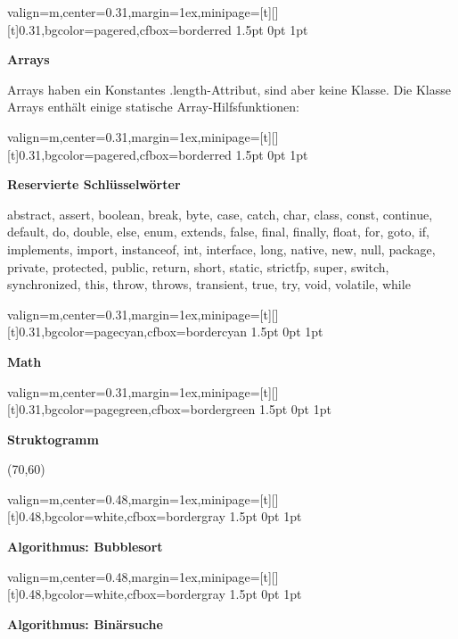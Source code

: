 \documentclass[11pt, a4paper, landscape]{article}
\newcommand{\fancyheader}[1]{
	\centerline{\sffamily \textbf{ \large #1}}
}
\newenvironment{fancybox}[2]
{
	\begin{adjustbox}{valign=m,center=0.31\textwidth,margin=1ex,minipage=[t][][t]{0.31\textwidth},bgcolor=#1,cfbox=#2 1.5pt 0pt 1pt}
	\begin{centering}
}
{
	\end{centering}
	\end{adjustbox}
}
\newenvironment{fancyboxwide}[2]
{
	\begin{adjustbox}{valign=m,center=0.48\textwidth,margin=1ex,minipage=[t][][t]{0.48\textwidth},bgcolor=#1,cfbox=#2 1.5pt 0pt 1pt}
	\begin{centering}
}
{
	\end{centering}
	\end{adjustbox}
}
\begin{document}
\begin{multicols}{3}
\begin{fancybox}{pagered}{borderred}
\fancyheader{Arrays}
\raggedright {
	Arrays haben ein Konstantes {\ttfamily .length}-Attribut, sind aber keine Klasse. Die Klasse {\ttfamily Arrays} enthält einige statische Array-Hilfsfunktionen:
}

\end{fancybox}

\begin{fancybox}{pagered}{borderred}
\fancyheader{Reservierte Schlüsselwörter}
{\ttfamily abstract, assert, boolean, break, byte, case, catch, char, class, const, continue, default, do, double, else, enum, extends, false, final, finally, float, for, goto, if, implements, import, instanceof, int, interface, long, native, new, null, package, private, protected, public, return, short, static, strictfp, super, switch, synchronized, this, throw, throws, transient, true, try, void, volatile, while}
\end{fancybox}

\begin{fancybox}{pagecyan}{bordercyan}
\fancyheader{Math}

\end{fancybox}

\begin{fancybox}{pagegreen}{bordergreen}
\fancyheader{Struktogramm}

\begin{struktogramm}(70,60)
			\change
		\ifend
		\change
	\ifend
\end{struktogramm}
\end{fancybox}

\end{multicols}

\newpage

\begin{fancyboxwide}{white}{bordergray}
\fancyheader{Algorithmus: Bubblesort}

\end{fancyboxwide}

\begin{multicols}{2}
\begin{fancyboxwide}{white}{bordergray}
\fancyheader{Algorithmus: Binärsuche}

\end{fancyboxwide}
\end{multicols}
\end{document}
